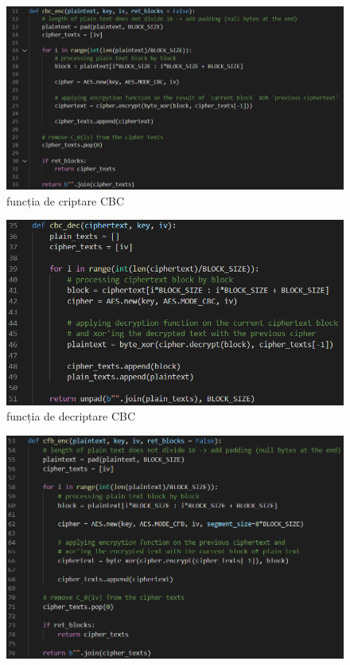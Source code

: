 \documentclass{article}
\begin{document}
\begin{center}
\begin{figure}[h!]
\includegraphics[scale=0.6]{1.jpg}
\caption{funcția de criptare CBC}
\end{figure}
\begin{figure}[h!]
\includegraphics[scale=0.7]{2.jpg}
\caption{funcția de decriptare CBC}
\end{figure}
\begin{figure}[h!]
\includegraphics[scale=0.6]{3.jpg}

\end{figure}
\end{center}
\end{document}
